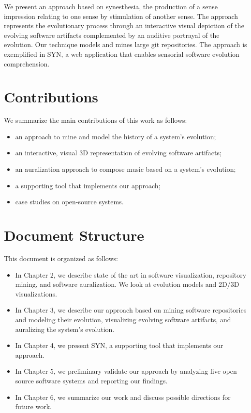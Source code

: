 We present an approach based on synesthesia, the production of a sense impression relating to one sense by stimulation of another sense. The approach represents the evolutionary process through an interactive visual depiction of the evolving software artifacts complemented by an auditive portrayal of the evolution. Our technique models and mines large git repositories.
The approach is exemplified in SYN, a web application that enables sensorial software evolution comprehension.
\newpage

\section{Contributions}
We summarize the main contributions of this work as follows:
\begin{itemize}
 \item an approach to mine and model the history of a system's evolution;
 \item an interactive, visual 3D representation of evolving software artifacts;
 \item an auralization approach to compose music based on a system's evolution;
 \item a supporting tool that implements our approach;
 \item case studies on open-source systems.
\end{itemize}


\section{Document Structure}
This document is organized as follows:
\begin{itemize}
 \item In Chapter 2, we describe state of the art in software visualization, repository mining, and software auralization. We look at evolution models and 2D/3D visualizations. 
 \item In Chapter 3, we describe our approach based on mining software repositories and modeling their evolution, visualizing evolving software artifacts, and auralizing the system's evolution. 
 \item In Chapter 4, we present SYN, a supporting tool that implements our approach. 
 \item In Chapter 5, we preliminary validate our approach by analyzing five open-source software systems and reporting our findings.
 \item In Chapter 6, we summarize our work and discuss possible directions for future work.
 \end{itemize}